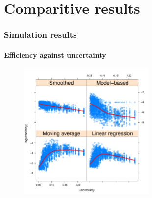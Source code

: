\documentclass[pdf]{beamer}
\begin{document}
\section{Comparitive results}
\begin{frame}
\frametitle{Simulation results}
\framesubtitle{Efficiency against uncertainty}
\begin{figure}
\includegraphics[width=0.6\textwidth]{../res/hcr_all_plot.pdf}
\end{figure}
\end{frame}

\frame{\titlepage}
\end{document}
